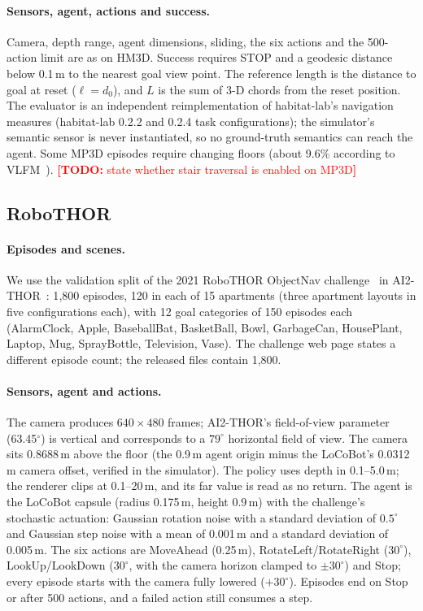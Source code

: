 \documentclass[10pt]{article}
\newcommand{\TODO}[1]{\textcolor{red}{\textbf{[TODO:} #1\textbf{]}}}
\begin{document}
\paragraph{Sensors, agent, actions and success.} Camera, depth range, agent dimensions, sliding, the six actions and the 500-action limit are as on HM3D. Success requires STOP and a geodesic distance below 0.1\,m to the nearest goal view point. The reference length is the distance to goal at reset ($\ell = d_0$), and $L$ is the sum of 3-D chords from the reset position. The evaluator is an independent reimplementation of habitat-lab's navigation measures (habitat-lab 0.2.2 and 0.2.4 task configurations); the simulator's semantic sensor is never instantiated, so no ground-truth semantics can reach the agent. Some MP3D episodes require changing floors (about 9.6\% according to VLFM~\citep{yokoyama2024vlfm}). \TODO{state whether stair traversal is enabled on MP3D}

\subsection{RoboTHOR}\label{app:protocols-robothor}

\paragraph{Episodes and scenes.} We use the validation split of the 2021 RoboTHOR ObjectNav challenge~\citep{deitke2020robothor} in AI2-THOR~\citep{kolve2017ai2}: 1{,}800 episodes, 120 in each of 15 apartments (three apartment layouts in five configurations each), with 12 goal categories of 150 episodes each (AlarmClock, Apple, BaseballBat, BasketBall, Bowl, GarbageCan, HousePlant, Laptop, Mug, SprayBottle, Television, Vase). The challenge web page states a different episode count; the released files contain 1{,}800.

\paragraph{Sensors, agent and actions.} The camera produces $640 \times 480$ frames; AI2-THOR's field-of-view parameter (63.45$^\circ$) is vertical and corresponds to a $79^\circ$ horizontal field of view. The camera sits 0.8688\,m above the floor (the 0.9\,m agent origin minus the LoCoBot's 0.0312\,m camera offset, verified in the simulator). The policy uses depth in 0.1--5.0\,m; the renderer clips at 0.1--20\,m, and its far value is read as no return. The agent is the LoCoBot capsule (radius 0.175\,m, height 0.9\,m) with the challenge's stochastic actuation: Gaussian rotation noise with a standard deviation of $0.5^\circ$ and Gaussian step noise with a mean of 0.001\,m and a standard deviation of 0.005\,m. The six actions are MoveAhead (0.25\,m), RotateLeft/RotateRight ($30^\circ$), LookUp/LookDown ($30^\circ$, with the camera horizon clamped to $\pm 30^\circ$) and Stop; every episode starts with the camera fully lowered ($+30^\circ$). Episodes end on Stop or after 500 actions, and a failed action still consumes a step.
\end{document}
